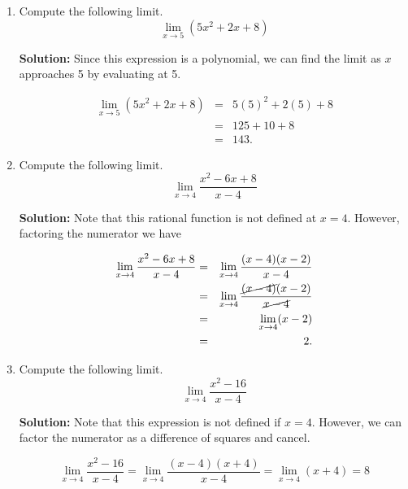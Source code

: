 \documentclass{article}
\begin{document}
\ActivityTitle[class=Calculus I, number=1, name=Limits (Solutions)]

\begin{enumerate}
\item Compute the following limit. \[ \lim_{x \rightarrow 5} \left( 5 x^2 + 2 x + 8 \right) \]

\textbf{Solution:} Since this expression is a polynomial, we can find the limit as $x$ approaches 5 by evaluating at 5.

\begin{eqnarray*}
\lim_{x \rightarrow 5} \left( 5 x^2 + 2 x + 8 \right)
 & = & 5 (5)^2 + 2 (5) + 8 \\
 & = & 125 + 10 + 8 \\
 & = & 143.
\end{eqnarray*}


  
\vspace{1cm}

\item Compute the following limit. \[ \displaystyle\lim_{x \rightarrow 4} \frac{x^2 - 6x + 8}{x - 4} \]

\textbf{Solution:} Note that this rational function is not defined at $x = 4$. However, factoring the numerator we have 

\begin{eqnarray*}
\lim_{x \rightarrow 4} \frac{x^2 - 6x + 8}{x - 4}
 & = & \lim_{x \rightarrow 4} \frac{(x - 4)(x - 2)}{x - 4} \\
 & = & \lim_{x \rightarrow 4} \frac{\cancel{(x - 4)}(x - 2)}{\cancel{x - 4}} \\
 & = & \lim_{x \rightarrow 4} (x - 2) \\
 & = & 2. \\
\end{eqnarray*}


  
\vspace{1cm}

\item Compute the following limit. \[ \lim_{x \rightarrow 4} \frac{x^2 - 16}{x - 4} \]

\textbf{Solution:} Note that this expression is not defined if $x = 4$. However, we can factor the numerator as a difference of squares and cancel.

\[ \lim_{x \rightarrow 4} \frac{x^2 - 16}{x - 4} = \lim_{x \rightarrow 4} \frac{(x - 4)(x + 4)}{x - 4} = \lim_{x \rightarrow 4} (x + 4) = 8 \]



\end{enumerate}
\end{document}
